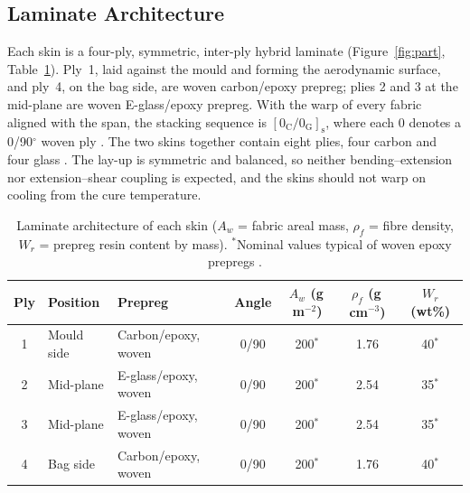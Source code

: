 \begin{addedblock}
\subsection{Laminate Architecture}

Each skin is a four-ply, symmetric, inter-ply hybrid laminate
(Figure~\ref{fig:part}, Table~\ref{tab:architecture}). Ply~1, laid
against the mould and forming the aerodynamic surface, and ply~4, on
the bag side, are woven carbon/epoxy prepreg; plies 2 and 3 at the
mid-plane are woven E-glass/epoxy prepreg. With the warp of every
fabric aligned with the span, the stacking sequence is
$[0_\mathrm{C}/0_\mathrm{G}]_\mathrm{s}$, where each 0 denotes a
0/90$^\circ$ woven ply . The
two skins together contain eight plies, four carbon and four glass
. The lay-up is symmetric and
balanced, so neither bending--extension nor extension--shear coupling
is expected, and the skins should not warp on cooling from the cure
temperature.
\end{addedblock}

\begin{table}[htbp]
    \addedfloat
    \centering
    \caption{Laminate architecture of each skin ($A_w$ = fabric areal
    mass, $\rho_f$ = fibre density, $W_r$ = prepreg resin content by
    mass). $^*$Nominal values typical of woven epoxy prepregs
    .}
    \label{tab:architecture}
    \small
    \renewcommand{\arraystretch}{1.1}
    \begin{tabular}{@{}cllcccc@{}}
        \toprule
        \textbf{Ply} & \textbf{Position} & \textbf{Prepreg}
        & \textbf{Angle} & $A_w$ (g\,m$^{-2}$) & $\rho_f$ (g\,cm$^{-3}$)
        & $W_r$ (wt\%) \\
        \midrule
        1 & Mould side & Carbon/epoxy, woven & 0/90 & 200$^*$ & 1.76 & 40$^*$ \\
        2 & Mid-plane & E-glass/epoxy, woven & 0/90 & 200$^*$ & 2.54 & 35$^*$ \\
        3 & Mid-plane & E-glass/epoxy, woven & 0/90 & 200$^*$ & 2.54 & 35$^*$ \\
        4 & Bag side & Carbon/epoxy, woven & 0/90 & 200$^*$ & 1.76 & 40$^*$ \\
        \bottomrule
    \end{tabular}
\end{table}

